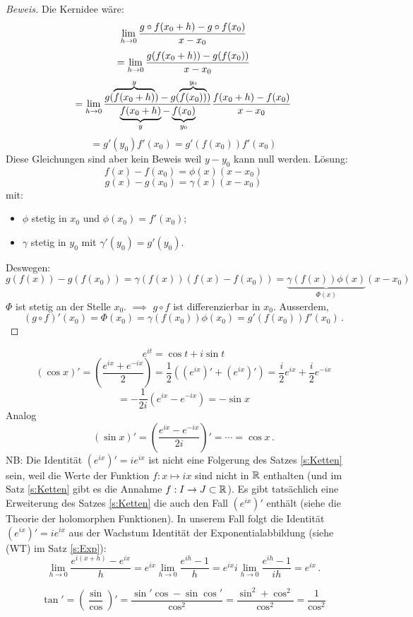 \begin{proof}[Beweis] Die Kernidee w\"are:
  \[\displaystyle\lim_{h\rightarrow0}\frac{g\circ f(x_0+h)-g\circ f(x_0)}{x-x_0}\]
  \[=\displaystyle\lim_{h\rightarrow0}\frac{g(f(x_0+h))-g(f(x_0))}{x-x_0}\]
  \[=\displaystyle\lim_{h\rightarrow0}\frac{g (\overbrace{f(x_0+h)}^y)-g ( \overbrace{f(x_0))}^{y_0})}{\underbrace{f(x_0+h)}_y-\underbrace{f(x_0)}_{y_0}}\frac{f(x_0+h)-f(x_0)}{x-x_0}\]
  \[=g'(y_0)f'(x_0)=g'(f(x_0))f'(x_0)\]
Diese Gleichungen sind aber kein Beweis weil $y-y_0$ kann null werden. Lösung:
  \[f(x)-f(x_0)=\phi(x)(x-x_0)\]
  \[g(x)-g(x_0)=\gamma(x)(x-x_0)\]
  mit:
\begin{itemize}
 \item  $\phi$ stetig in $x_0$ und $\phi(x_0)=f'(x_0)$;
\item $\gamma$ stetig in $y_0$ mit $\gamma'(y_0)=g'(y_0)$.
\end{itemize}
Deswegen:
\[g(f(x))-g(f(x_0))=\gamma(f(x))(f(x)-f(x_0))=\underbrace{\gamma(f(x))\phi(x)}_{\Phi(x)}(x-x_0)\]
  $\Phi$ ist stetig an der Stelle $x_0$. $\implies$ $g\circ f$ ist differenzierbar in $x_0$.
Ausserdem,
  \[(g\circ f)'(x_0)=\Phi(x_0)=\gamma(f(x_0))\phi(x_0)=g'(f(x_0))f'(x_0)\, .\]
\end{proof}
\begin{Bsp}
  \[e^{it}=\cos t+i\sin t\]
  \[(\cos x)'=\left(\frac{e^{ix}+e^{-ix}}{2}\right)=
\frac{1}{2}\left( (e^{ix})'+(e^{ix})' \right)=\frac{i}{2} e^{ix}+\frac{i}{2}e^{-ix}\]
\[=-\frac{1}{2i}(e^{ix}-e^{-ix})=-\sin x\]
Analog
  \[(\sin x)'=\left(\frac{e^{ix}-e^{-ix}}{2i}\right)'=\cdots=\cos x\, .\]
NB: Die Identit\"at $(e^{ix})' = i e^{ix}$ ist nicht eine Folgerung des Satzes
\ref{s:Ketten} sein, weil die Werte der Funktion $f: x\mapsto ix$ sind nicht
in $\mathbb{R}$ enthalten (und im Satz \ref{s:Ketten} gibt es die Annahme
$f:I\to J\subset \mathbb{R}$). Es gibt tats\"achlich eine Erweiterung des Satzes 
\ref{s:Ketten} die auch den Fall $(e^{ix})'$ enth\"alt (siehe die Theorie
der holomorphen Funktionen). In unserem Fall folgt die Identit\"at 
$(e^{ix})' = i e^{ix}$ aus der Wachstum Identit\"at der Exponentialabbildung
(siehe (WT) im Satz \ref{s:Exp}):
\[
 \lim_{h\to 0} \frac{e^{i(x+h)}- e^{ix}}{h} 
= e^{ix} \lim_{h\to 0} \frac{e^{ih} - 1}{h}
= e^{ix} i \lim_{h\to 0} \frac{e^{ih} -1}{ih} = e^{ix}\, .
\]
\end{Bsp}
\begin{Bsp}
\[\tan'=\left( \frac{\sin}{\cos} \right)'=
\frac{\sin'\cos-\sin\cos'}{\cos^2}=\frac{\sin^2+\cos^2}{\cos^2}=\frac{1}{\cos^2}\]
\end{Bsp}
